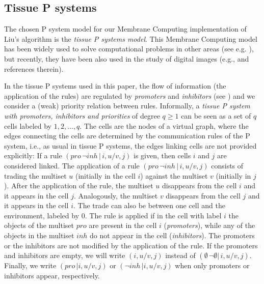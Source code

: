 \documentclass[journal]{IEEEtran}
\begin{document}
\subsection{Tissue P systems}\label{def}
The chosen P system model for our Membrane Computing implementation
of Liu's algorithm is the {\it tissue P systems model}. This
Membrane Computing model has been widely used to solve computational
problems in other areas (see e.g.
\cite{DBLP:conf/iwinac/Diaz-PernilGPR09,Diaz-PernilGPR2010}), but
recently, they have been also used in the study of digital images
(e.g.,
\cite{Diaz-PernilGRS10,DBLP:conf/caip/Pena-CantillanaDBG11,DBLP:journals/ijncr/Pena-CantillanaDCG11}
and references therein).

In the tissue P systems used in this paper, the flow of information (the
application of the rules) are regulated by \emph{promoters} and
\emph{inhibitors} (see \cite{DBLP:journals/acta/BottoniMPR02}) and we consider a
(weak) priority relation between rules. Informally, a {\it tissue P system with
promoters, inhibitors and priorities} of degree $q \geq 1$ can be seen as a set
of $q$ cells labeled by $1,2,\dots,q$. The cells are the nodes of a virtual
graph, where the edges connecting the cells are determined by the communication
rules of the P system, i.e., as usual in tissue P systems, the edges linking
cells are not provided explicitly: If a rule $(pro\,\neg inh\,|\,i,u/v,j)$ is
given, then cells $i$ and $j$ are considered linked. The application of a rule
$(pro\,\neg inh\,|\,i,u/v,j)$ consists of trading the multiset $u$ (initially in
the cell $i$) against the multiset $v$ (initially in $j$). After the application
of the rule, the multiset $u$ disappears from the cell $i$ and it appears in the
cell $j$. Analogously, the multiset $v$ disappears from the cell $j$ and it
appears in the cell $i$. The trade can also be between one cell and the
environment, labeled by 0. The rule is applied if in the cell with label $i$ the
objects of the multiset $pro$ are present in the cell $i$ (\emph{promoters}),
while any of the objects in the multiset $inh$ do not appear in the cell
(\emph{inhibitors}). The promoters or the inhibitors are not modified by the
application of the rule. If the promoters and inhibitors are empty, we will
write $(i,u/v,j)$ instead of $(\emptyset\,\neg\emptyset|\,i,u/v,j)$. Finally, we
write $(pro\,|i,u/v,j)$ or $(\neg inh\,|i,u/v,j)$ when only promoters or
inhibitors appear, respectively.
\end{document}
